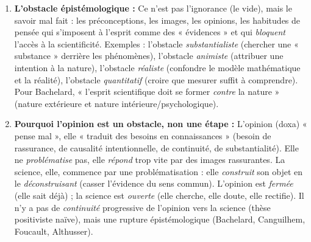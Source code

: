 \documentclass[11pt]{article}
\newcommand{\cle}[1]{{\popxbold\color{popdark}#1}}
\begin{document}
\begin{corrige}
\begin{enumerate}
\item \textbf{L'\cle{obstacle épistémologique} :} Ce n'est pas l'ignorance (le vide), mais le \cle{savoir mal fait} : les \cle{préconceptions}, les \cle{images}, les \cle{opinions}, les \cle{habitudes de pensée} qui s'imposent à l'esprit comme des « évidences » et qui \emph{bloquent} l'accès à la scientificité. Exemples : l'obstacle \emph{substantialiste} (chercher une « substance » derrière les phénomènes), l'obstacle \emph{animiste} (attribuer une intention à la nature), l'obstacle \emph{réaliste} (confondre le modèle mathématique et la réalité), l'obstacle \emph{quantitatif} (croire que mesurer suffit à comprendre). Pour Bachelard, « l'esprit scientifique doit se former \emph{contre} la nature » (nature extérieure et nature intérieure/psychologique).

\item \textbf{Pourquoi l'opinion est un obstacle, non une étape :} L'opinion (doxa) « pense mal », elle « traduit des besoins en connaissances » (besoin de rassurance, de causalité intentionnelle, de continuité, de substantialité). Elle ne \emph{problématise} pas, elle \emph{répond} trop vite par des images rassurantes. La science, elle, commence par une \cle{problématisation} : elle \emph{construit} son objet en le \emph{déconstruisant} (casser l'évidence du sens commun). L'opinion est \emph{fermée} (elle sait déjà) ; la science est \emph{ouverte} (elle cherche, elle doute, elle rectifie). Il n'y a pas de \emph{continuité} progressive de l'opinion vers la science (thèse positiviste naïve), mais une \cle{rupture épistémologique} (Bachelard, Canguilhem, Foucault, Althusser).


\end{enumerate}
\end{corrige}
\end{document}
